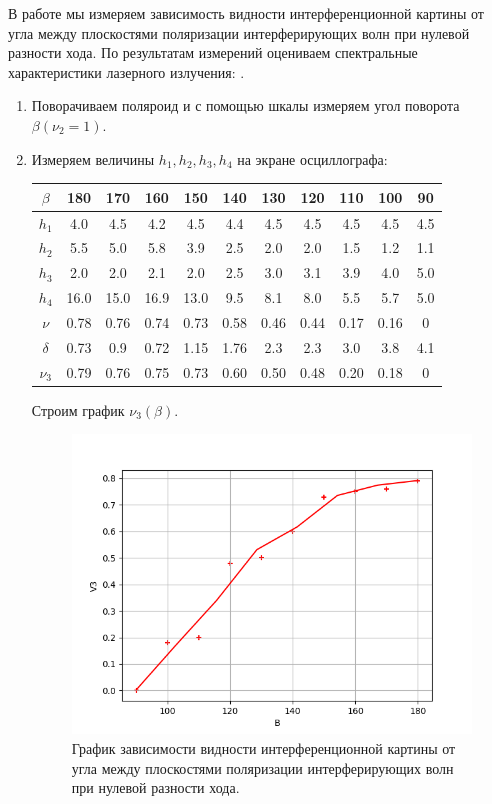 \documentclass[a4paper,12pt]{article}
\begin{document}
В работе мы измеряем зависимость видности интерференционной картины от угла между плоскостями поляризации интерферирующих волн при нулевой разности хода. По результатам измерений оцениваем спектральные характеристики лазерного излучения: .

\begin{enumerate}

\item Поворачиваем поляроид и с помощью шкалы измеряем угол поворота $\beta (\nu_2 = 1).$ 
\item Измеряем величины $h_1, h_2, h_3, h_4$ на экране осциллографа:



\begin{table}[H]
\begin{center}
\begin{tabular}{|c|c|c|c|c|c|c|c|c|c|c|}
\hline $\beta  $&180&170&160&150&140&130&120&110&100&90\\
\hline $h_1$&4.0&4.5&4.2&4.5&4.4&4.5&4.5&4.5&4.5&4.5\\
\hline $h_2$&5.5&5.0&5.8&3.9&2.5&2.0&2.0&1.5&1.2&1.1\\
\hline $h_3$&2.0&2.0&2.1&2.0&2.5&3.0&3.1&3.9&4.0&5.0\\
\hline $h_4$&16.0&15.0&16.9&13.0&9.5&8.1&8.0&5.5&5.7&5.0\\
\hline $\nu $&0.78&0.76&0.74&0.73&0.58&0.46&0.44&0.17&0.16&0\\
\hline $\delta$&0.73&0.9&0.72&1.15&1.76&2.3&2.3&3.0&3.8&4.1\\
\hline $\nu_3$&0.79&0.76&0.75&0.73&0.60&0.50&0.48&0.20&0.18&0\\
\hline 
\end{tabular}
\end{center}
\end{table}


  Строим график $\nu_3(\beta)$.


\begin{figure}[H]
  \begin{center}
    \includegraphics[width=13cm]{gra1.png}
    \caption{График зависимости видности интерференционной картины от угла между плоскостями поляризации интерферирующих волн при нулевой разности хода.}
    \label{fig:}
  \end{center}
\end{figure}


\end{enumerate}
\end{document}
